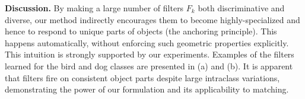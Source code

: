 \documentclass[10pt,twocolumn,letterpaper]{article}
\newcommand{\myparagraph}[1]{\vspace{0.15cm}\noindent\textbf{#1.}}
\begin{document}
\myparagraph{Discussion} By making a large number of filters $F_k$ both discriminative and diverse, our method indirectly encourages them to become highly-specialized and hence to respond to unique parts of objects (the anchoring principle). This happens automatically, without enforcing such geometric properties explicitly.
%
This intuition is strongly supported by our experiments. Examples of the filters learned for the bird and dog classes are presented in  (a) and (b). It is apparent that filters fire on consistent object parts despite large intraclass variations, demonstrating the power of our formulation and its applicability to matching. 
\end{document}
